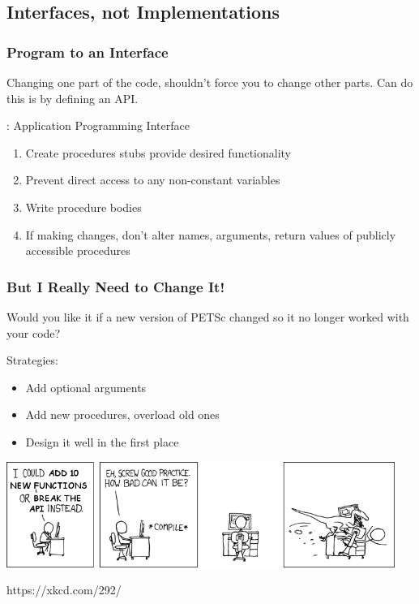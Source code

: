 \documentclass[12pt]{beamer}
\begin{document}
\subsection{Interfaces, not Implementations}

\begin{frame}
  \frametitle{Program to an Interface}
  Changing one part of the code, shouldn't force you to change
  other parts. Can do this is by defining an API.
  
  \begin{definition}
    : Application Programming Interface 
  \end{definition}
  
  \begin{enumerate}
  \item Create procedures stubs provide desired functionality
  \item Prevent direct access to any non-constant variables
  \item Write procedure bodies
  \item If making changes, don't alter names, arguments, return values
    of publicly accessible procedures
  \end{enumerate}
\end{frame}

\begin{frame}
  \frametitle{But I Really Need to Change It!}
  Would you like it if a new version of PETSc changed so it no longer
  worked with your code?
  
  \vspace{3mm}
  Strategies:
  \begin{itemize}
  \item Add optional arguments
  \item Add new procedures, overload old ones
  \item Design it well in the first place
  \end{itemize}
  
  \vspace{2mm}
  \begin{center}
    \includegraphics[width=0.95\textwidth]{break_api.png}
    
    \vspace{-2mm}{\scriptsize (With apologies to Randall Munroe.)}
    {\tiny https://xkcd.com/292/}
  \end{center}

\end{frame}
\end{document}
